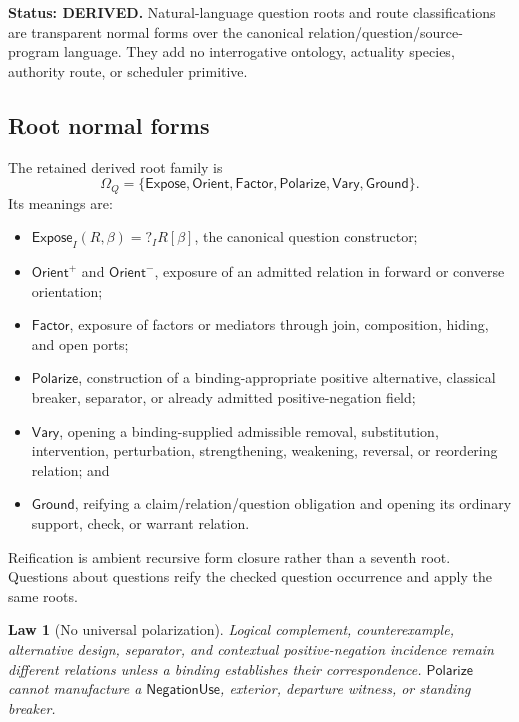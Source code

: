 \documentclass[11pt,oneside]{article}
\newtheorem{law}[definition]{Law}
\begin{document}
\textbf{Status: DERIVED.}  Natural-language question roots and route classifications are
transparent normal forms over the canonical relation/question/source-program language.  They add
no interrogative ontology, actuality species, authority route, or scheduler primitive.

\subsection{Root normal forms}

The retained derived root family is
\[
\boxed{
\Omega_Q=
\{\mathsf{Expose},\mathsf{Orient},\mathsf{Factor},
\mathsf{Polarize},\mathsf{Vary},\mathsf{Ground}\}.
}
\]
Its meanings are:
\begin{itemize}
\item \(\mathsf{Expose}_I(R,\beta)=?_I R[\beta]\), the canonical question constructor;
\item \(\mathsf{Orient}^{+}\) and \(\mathsf{Orient}^{-}\), exposure of an admitted relation in
      forward or converse orientation;
\item \(\mathsf{Factor}\), exposure of factors or mediators through join, composition, hiding, and
      open ports;
\item \(\mathsf{Polarize}\), construction of a binding-appropriate positive alternative,
      classical breaker, separator, or already admitted positive-negation field;
\item \(\mathsf{Vary}\), opening a binding-supplied admissible removal, substitution,
      intervention, perturbation, strengthening, weakening, reversal, or reordering relation; and
\item \(\mathsf{Ground}\), reifying a claim/relation/question obligation and opening its ordinary
      support, check, or warrant relation.
\end{itemize}
Reification is ambient recursive form closure rather than a seventh root.  Questions about
questions reify the checked question occurrence and apply the same roots.

\begin{law}[No universal polarization]\label{law:no-universal-polarization}
Logical complement, counterexample, alternative design, separator, and contextual
positive-negation incidence remain different relations unless a binding establishes their
correspondence.  \(\mathsf{Polarize}\) cannot manufacture a \(\mathsf{NegationUse}\), exterior,
departure witness, or standing breaker.
\end{law}
\end{document}
